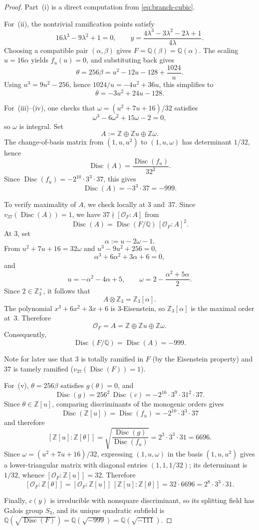 \documentclass[11pt,letterpaper]{article}
\theoremstyle{plain}
\theoremstyle{remark}
\newcommand{\QQ}{\mathbb{Q}}
\newcommand{\ZZ}{\mathbb{Z}}
\newcommand{\Disc}{\operatorname{Disc}}
\begin{document}
\begin{proof}
Part~(i) is a direct computation from \eqref{eq:branch-cubic}.

For~(ii), the nontrivial ramification points satisfy
\[
16\lambda^3-9\lambda^2+1=0,
\qquad
y=\frac{4\lambda^3-3\lambda^2-2\lambda+1}{4\lambda}.
\]
Choosing a compatible pair \((\alpha,\beta)\) gives \(F=\QQ(\beta)=\QQ(\alpha)\). The scaling \(u=16\alpha\) yields \(f_u(u)=0\), and substituting back gives
\[
\theta=256\beta=u^2-12u-128+\frac{1024}{u}.
\]
Using \(u^3=9u^2-256\), hence \(1024/u=-4u^2+36u\), this simplifies to
\[
\theta=-3u^2+24u-128.
\]

For~(iii)--(iv), one checks that \(\omega=(u^2+7u+16)/32\) satisfies
\[
\omega^3-6\omega^2+15\omega-2=0,
\]
so \(\omega\) is integral. Set
\[
A:=\ZZ\oplus \ZZ u\oplus \ZZ\omega.
\]
The change-of-basis matrix from \((1,u,u^2)\) to \((1,u,\omega)\) has determinant \(1/32\), hence
\[
\Disc(A)=\frac{\Disc(f_u)}{32^2}.
\]
Since \(\Disc(f_u)=-2^{10}\cdot 3^3\cdot 37\), this gives
\[
\Disc(A)=-3^3\cdot 37=-999.
\]

To verify maximality of \(A\), we check locally at \(3\) and~\(37\). Since \(v_{37}(\Disc(A))=1\), we have \(37\nmid [\mathcal O_F:A]\) from
\[
\Disc(A)=\Disc(F/\QQ)\,[\mathcal O_F:A]^2.
\]
At \(3\), set
\[
\alpha:=u-2\omega-1.
\]
From \(u^2+7u+16=32\omega\) and \(u^3-9u^2+256=0\),
\[
\alpha^3+6\alpha^2+3\alpha+6=0,
\]
and
\[
u=-\alpha^2-4\alpha+5,
\qquad
\omega=2-\frac{\alpha^2+5\alpha}{2}.
\]
Since \(2\in\ZZ_3^\times\), it follows that
\[
A\otimes \ZZ_3=\ZZ_3[\alpha].
\]
The polynomial \(x^3+6x^2+3x+6\) is \(3\)-Eisenstein, so \(\ZZ_3[\alpha]\) is the maximal order at~\(3\). Therefore
\[
\mathcal O_F=A=\ZZ\oplus \ZZ u\oplus \ZZ\omega.
\]
Consequently,
\[
\Disc(F/\QQ)=\Disc(A)=-999.
\]

Note for later use that \(3\) is totally ramified in \(F\) (by the Eisenstein property) and \(37\) is tamely ramified (\(v_{37}(\Disc(F))=1\)).

For~(v), \(\theta=256\beta\) satisfies \(g(\theta)=0\), and
\[
\Disc(g)=256^2\,\Disc(c)=-2^{16}\cdot 3^9\cdot 31^2\cdot 37.
\]
Since \(\theta\in \ZZ[u]\), comparing discriminants of the monogenic orders gives
\[
\Disc(\ZZ[u])=\Disc(f_u)=-2^{10}\cdot 3^3\cdot 37
\]
and therefore
\[
[\ZZ[u]:\ZZ[\theta]]
=\sqrt{\frac{\Disc(g)}{\Disc(f_u)}}
=2^3\cdot 3^3\cdot 31
=6696.
\]
Since \(\omega=(u^2+7u+16)/32\), expressing \((1,u,\omega)\) in the basis \((1,u,u^2)\) gives a lower-triangular matrix with diagonal entries \((1,1,1/32)\); its determinant is \(1/32\), whence \([\mathcal O_F:\ZZ[u]]=32\). Therefore
\[
[\mathcal O_F:\ZZ[\theta]]
=[\mathcal O_F:\ZZ[u]]\,[\ZZ[u]:\ZZ[\theta]]
=32\cdot 6696
=2^8\cdot 3^3\cdot 31.
\]

Finally, \(c(y)\) is irreducible with nonsquare discriminant, so its splitting field has Galois group \(S_3\), and its unique quadratic subfield is \(\QQ(\sqrt{\Disc(F)})=\QQ(\sqrt{-999})=\QQ(\sqrt{-111})\).
\end{proof}
\end{document}
